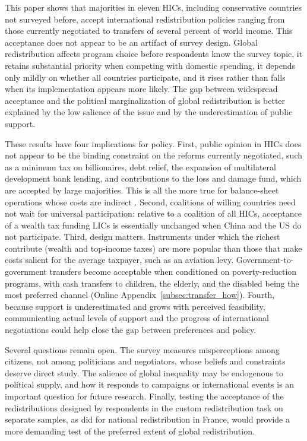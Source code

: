 \documentclass[12pt,english]{article}
\begin{document}
This paper shows that majorities in eleven HICs, including conservative countries not surveyed before, accept international redistribution policies ranging from those currently negotiated to transfers of several percent of world income. This acceptance does not appear to be an artifact of survey design. Global redistribution affects program choice before respondents know the survey topic, it retains substantial priority when competing with domestic spending, it depends only mildly on whether all countries participate, and it rises rather than falls when its implementation appears more likely. The gap between widespread acceptance and the political marginalization of global redistribution is better explained by the low salience of the issue and by the underestimation of public support.

These results have four implications for policy. First, public opinion in HICs does not appear to be the binding constraint on the reforms currently negotiated, such as a minimum tax on billionaires, debt relief, the expansion of multilateral development bank lending, and contributions to the loss and damage fund, which are accepted by large majorities. This is all the more true for balance-sheet operations whose costs are indirect \citep{bridgetown_initiative_bridgetown_2025,ffd4_outcome_2025}. Second, coalitions of willing countries need not wait for universal participation: relative to a coalition of all HICs, acceptance of a wealth tax funding LICs is essentially unchanged when China and the US do not participate. Third, design matters. Instruments under which the richest contribute (wealth and top-income taxes) are more popular than those that make costs salient for the average taxpayer, such as an aviation levy. Government-to-government transfers become acceptable when conditioned on poverty-reduction programs, with cash transfers to children, the elderly, and the disabled being the most preferred channel (Online Appendix~\ref{subsec:transfer_how}). Fourth, because support is underestimated and grows with perceived feasibility, communicating actual levels of support and the progress of international negotiations could help close the gap between preferences and policy.

Several questions remain open. The survey measures misperceptions among citizens, not among politicians and negotiators, whose beliefs and constraints deserve direct study. The salience of global inequality may be endogenous to political supply, and how it responds to campaigns or international events is an important question for future research. Finally, testing the acceptance of the redistributions designed by respondents in the custom redistribution task on separate samples, as \cite{fabre_french_2022} did for national redistribution in France, would provide a more demanding test of the preferred extent of global redistribution.

\clearpage
\singlespacing


\end{document}
